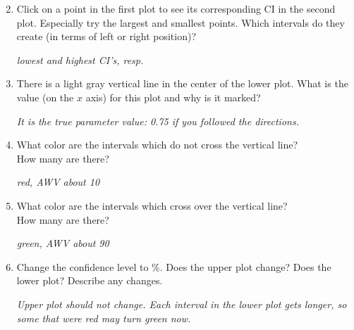   \begin{enumerate}
    \setcounter{enumi}{1}
  \item   Click on a point in the first plot to see its corresponding CI in
  the second plot.  Especially try the largest and smallest points.
  Which intervals do they create (in terms of left or right position)?
\begin{students}
  \vspace{1cm}
\end{students}
\begin{key}
  {\it lowest and highest CI's, resp.}
\end{key}
\item There is a light gray vertical line in the center of the lower
  plot. What is the value (on the $x$ axis) for this plot and why is
  it marked?
\begin{students}
  \vspace{1cm}
\end{students}
\begin{key}
  {\it It is the true parameter value: 0.75 if you followed the directions.}
\end{key}
\item What color are the intervals which do not cross the vertical
  line? \\How many are there?
\begin{students}
  \vspace{1cm}
\end{students}

\begin{key}
  {\it red, AWV about 10}
\end{key}

\item What color are the intervals which cross over the vertical
  line? \\How many are there?
\begin{students}
  \vspace{1cm}
\end{students}

\begin{key}
  {\it green, AWV about 90}
\end{key}

\item Change the confidence level to \%. Does the upper plot
  change?  Does the lower plot?  Describe any changes.
\begin{students}
  \vspace{1cm}
\end{students}
\begin{key}
  {\it Upper plot should not change. Each interval in the lower plot
    gets longer, so some that were red may turn green now.}
\end{key}



\end{enumerate}
